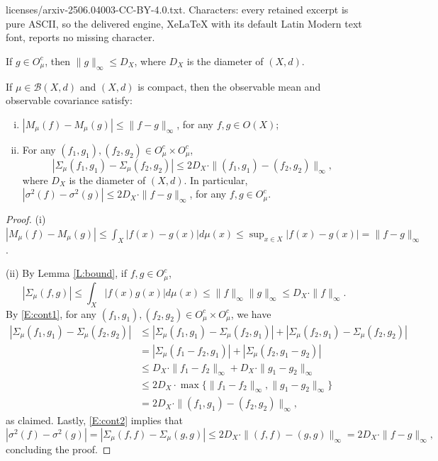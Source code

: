 \documentclass[10pt,a4paper]{amsart}
\newcommand{\borel}{\ensuremath{\mathcal{B}}}
\newcommand{\cobs}[1]{\ensuremath{O^c_{#1}}}
\newcommand{\obs}[1]{\ensuremath{O(#1)}}
\begin{document}
licenses/arxiv-2506.04003-CC-BY-4.0.txt. Characters: every retained excerpt is pure ASCII, so the delivered engine, XeLaTeX with its default Latin Modern text font, reports no missing character.
\begin{lemma} \label{L:bound}
If $g \in \cobs{\mu}$, then $\|g\|_\infty \leq D_X$, where $D_X$ is the diameter of $(X,d)$.
\end{lemma}

\begin{proposition} \label{P:continuity}
If $\mu \in \borel (X,d)$ and $(X,d)$ is compact, then the observable mean and observable covariance satisfy:
\begin{enumerate}[(i)]
\item $|M_\mu (f) - M_\mu(g)| \leq \|f-g\|_\infty$, for any $f,g \in \obs{X}$;
\item For any $(f_1,g_1), (f_2,g_2) \in \cobs{\mu} \times \cobs{\mu}$,
\[
|\Sigma_\mu (f_1,g_1) - \Sigma_\mu (f_2,g_2)|  \leq 2D_X \cdot \|(f_1,g_1)-(f_2,g_2)\|_\infty,
\]
where $D_X$ is the diameter of $(X,d)$. In particular, $|\sigma^2 (f) - \sigma^2(g)| \leq 2 D_X \cdot \|f-g\|_\infty$,
for any $f,g \in \cobs{\mu}$.
\end{enumerate}
\end{proposition}

\begin{proof}
(i) $|M_\mu (f)-M_\mu(g)| \leq \int_X |f(x)-g(x)| d\mu (x) \leq \sup_{x\in X} |f(x)-g(x)| = \|f-g\|_\infty$.

\medskip

(ii) By Lemma \ref{L:bound}, if $f,g \in \cobs{\mu}$,
\begin{equation} \label{E:cont1}
|\Sigma_\mu (f,g)| \leq \int_X |f(x) g(x)| d\mu (x) \leq \|f\|_\infty \|g\|_\infty \leq D_X \cdot \|f\|_\infty.
\end{equation}
By \eqref{E:cont1}, for any $(f_1,g_1), (f_2,g_2) \in \cobs{\mu} \times \cobs{\mu}$, we have
\begin{equation}\label{E:cont2}
\begin{split}
|\Sigma_\mu (f_1,g_1) - \Sigma_\mu (f_2,g_2)| &\leq 
|\Sigma_\mu (f_1,g_1) - \Sigma_\mu (f_2,g_1)| + |\Sigma_\mu (f_2,g_1) - \Sigma_\mu (f_2,g_2)|  \\
&= |\Sigma_\mu (f_1-f_2,g_1)| + |\Sigma_\mu (f_2,g_1-g_2)| \\
&\leq D_X \cdot \|f_1-f_2\|_\infty + D_X \cdot \|g_1-g_2\|_\infty \\
&\leq 2 D_X \cdot \max\{\|f_1-f_2\|_\infty, \|g_1-g_2\|_\infty\} \\
&= 2D_X \cdot \|(f_1,g_1)-(f_2,g_2)\|_\infty,
\end{split}
\end{equation}
as claimed. Lastly, \eqref{E:cont2} implies that
\begin{equation}
|\sigma^2 (f) - \sigma^2(g)| = |\Sigma_\mu(f,f) - \Sigma_\mu(g,g)|  
\leq 2D_X \cdot \|(f,f)-(g,g)\|_\infty = 2D_X \cdot \|f-g\|_\infty,
\end{equation}
concluding the proof.

\end{proof}
\end{document}
